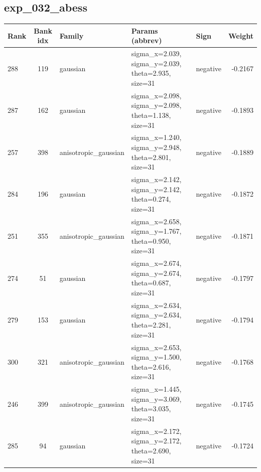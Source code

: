 \documentclass{article}
\begin{document}
\subsection*{exp\_032\_abess}
\begin{center}
\begin{tabular}{lclllr}
\toprule
Rank & Bank idx & Family & Params (abbrev) & Sign & Weight \\
\midrule

288 & 119 & gaussian & sigma\_x=2.039, sigma\_y=2.039, theta=2.935, size=31 & negative & -0.2167 \\
287 & 162 & gaussian & sigma\_x=2.098, sigma\_y=2.098, theta=1.138, size=31 & negative & -0.1893 \\
257 & 398 & anisotropic\_gaussian & sigma\_x=1.240, sigma\_y=2.948, theta=2.801, size=31 & negative & -0.1889 \\
284 & 196 & gaussian & sigma\_x=2.142, sigma\_y=2.142, theta=0.274, size=31 & negative & -0.1872 \\
251 & 355 & anisotropic\_gaussian & sigma\_x=2.658, sigma\_y=1.767, theta=0.950, size=31 & negative & -0.1871 \\
274 & 51 & gaussian & sigma\_x=2.674, sigma\_y=2.674, theta=0.687, size=31 & negative & -0.1797 \\
279 & 153 & gaussian & sigma\_x=2.634, sigma\_y=2.634, theta=2.281, size=31 & negative & -0.1794 \\
300 & 321 & anisotropic\_gaussian & sigma\_x=2.653, sigma\_y=1.500, theta=2.616, size=31 & negative & -0.1768 \\
246 & 399 & anisotropic\_gaussian & sigma\_x=1.445, sigma\_y=3.069, theta=3.035, size=31 & negative & -0.1745 \\
285 & 94 & gaussian & sigma\_x=2.172, sigma\_y=2.172, theta=2.690, size=31 & negative & -0.1724 \\
\bottomrule
\end{tabular}
\end{center}
\end{document}
